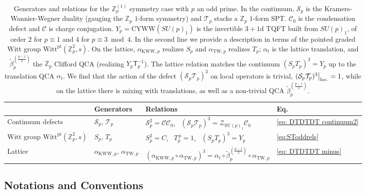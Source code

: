 \documentclass[aps,twocolumn,prx,floatfix,preprintnumbers, nofootinbib,10pt]{revtex4-2}
\numberwithin{equation}{section}
\theoremstyle{definition}
\theoremstyle{remark}
\theoremstyle{claim}
\newcommand{\aKWWp}{\alpha_{\text{KWW},p}}
\newcommand{\aTWp}{\alpha_{\text{TW},p}}
\newcommand{\Z}{{\mathbb Z}}
\newcommand{\cC}{\mathcal{C}}
\newcommand{\cS}{\mathcal{S}}
\newcommand{\cT}{\mathcal{T}}
\newcommand{\Witt}{\text{Witt}}
\newcommand{\pt}{\text{pt}}
\newcommand{\mc}[1]{\mathcal{#1}}
\newcommand\restr[2]{{%
  \left.\kern-\nulldelimiterspace %
  #1 %
  \right|_{#2} %
}}
\newcommand{\opaction}[1]{\restr{#1}{\text{loc.}}}
\begin{document}
\begin{table}[t]
\centering
\renewcommand{\arraystretch}{1.4}
\begin{tabular}{@{}l |l |l| l@{}}
\toprule
 & Generators & Relations & Eq. \\
\midrule
Continuum defects
  & $\mc{S}_p$, $\mc{T}_p$
  & {$\mc{S}_p^2 = \mc{C} \mc{C}_0$}, \ $(\mc{S}_p\mc{T}_p)^3 = \mc{Z}_{\text{SU}(p)_1} \mc{C}_0$
  & \eqref{eq: DTDTDT continuum2} \\
  Witt group $\Witt^\pt (\Z_p^2, s)$ 
  & $S_p$, $T_p$
  & $S_p^2=C$, \ $T_p^{\,p}=1$, \ $(S_pT_p)^3=Y_p$
  & \eqref{eq:SToddrels} \\
Lattice
  & $\aKWWp$, $\aTWp$
  & $(\aKWWp \circ \aTWp)^3=\alpha_t\circ \tilde\beta_p^{(\frac{p-1}{2})} \circ \aTWp$
  & \eqref{eq: DTDTDT minus} \\
\bottomrule
\end{tabular}
\caption{Generators and relations for the $\Z_p^{(1)}$ symmetry case with $p$ an odd prime. In the continuum, $\cS_p$ is the Kramers-Wannier-Wegner duality (gauging the $\Z_p$ $1$-form symmetry) and $\cT_p$ stacks a $\Z_p$ $1$-form SPT. $
\cC_0$ is the condensation defect and 
$\cC$ is charge conjugation.  $Y_p=\mathrm{CYWW}(SU(p)_1)$ is the invertible
$3+1$d TQFT built from $SU(p)_1$, of order $2$ for $p\equiv1$ and $4$ for
$p\equiv3\bmod4$.
{In the second line we provide a description in terms of the pointed graded Witt group $\Witt^{\pt} (\Z_p^2, s)$.}
On the lattice, $\aKWWp$ realizes $S_p$ and $\aTWp$ realizes
$T_p$; $\alpha_t$ is the lattice translation, and $\tilde\beta_p^{(\frac{p-1}{2})}$ the $\Z_p$ Clifford QCA
(realizing $Y_p\mathsf{T}_p^{-1}$). The lattice relation matches the continuum
$(S_pT_p)^3=Y_p$ up to the translation QCA $\alpha_t$. We find that the action of the defect $(\mc{S}_p \mc{T}_p)^3$ on local operators is trivial, $\opaction{(\mc{S}_p \mc{T}_p)^3} = 1$, while on the lattice there is mixing with translations, as well as a non-trivial QCA $\tilde{\beta}_p^{(\frac{p-1}{2})}$.}
\label{tab:podd-relations}
\end{table}







\subsection*{Notations and Conventions}
\label{sec: Notations and conventions}
\end{document}
